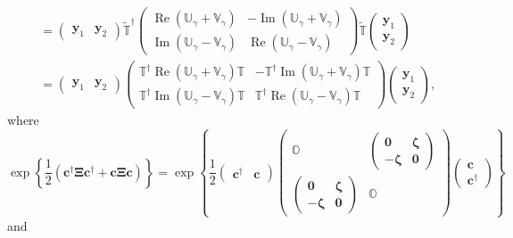 \documentclass[aps, preprint]{revtex4}
\begin{document}
\begin{align}
 &  =\left (\begin{array}{cc}\mathbf{y}_{1} & \mathbf{y}_{2}\end{array}\right ) \widetilde{\mathbb{T}}^{ \dag } \left (\begin{array}{cc}\ensuremath{\operatorname*{Re}} \left (\mathbb{U}_{\gamma } +\mathbb{V}_{\gamma }\right ) &  -\ensuremath{\operatorname*{Im}} \left (\mathbb{U}_{\gamma } +\mathbb{V}_{\gamma }\right ) \\
\ensuremath{\operatorname*{Im}} \left (\mathbb{U}_{\gamma } -\mathbb{V}_{\gamma }\right ) & \ensuremath{\operatorname*{Re}} \left (\mathbb{U}_{\gamma } -\mathbb{V}_{\gamma }\right )\end{array}\right ) \widetilde{\mathbb{T}} \left (\begin{array}{c}\mathbf{y}_{1} \\
\mathbf{y}_{2}\end{array}\right ) \\
 &  =\left (\begin{array}{cc}\mathbf{y}_{1} & \mathbf{y}_{2}\end{array}\right ) \left (\begin{array}{cc}\mathbb{T}^{ \dag } \ensuremath{\operatorname*{Re}} \left (\mathbb{U}_{\gamma } +\mathbb{V}_{\gamma }\right ) \mathbb{T} &  -\mathbb{T}^{ \dag } \ensuremath{\operatorname*{Im}} \left (\mathbb{U}_{\gamma } +\mathbb{V}_{\gamma }\right ) \mathbb{T} \\
\mathbb{T}^{ \dag } \ensuremath{\operatorname*{Im}} \left (\mathbb{U}_{\gamma } -\mathbb{V}_{\gamma }\right ) \mathbb{T} & \mathbb{T}^{ \dag } \ensuremath{\operatorname*{Re}} \left (\mathbb{U}_{\gamma } -\mathbb{V}_{\gamma }\right ) \mathbb{T}\end{array}\right ) \left (\begin{array}{c}\mathbf{y}_{1} \\
\mathbf{y}_{2}\end{array}\right )\text{,}\end{align}where
\begin{equation}\exp  \left \{\frac{1}{2} \left (\mathbf{c}^{ \dag } \mathbf{\Xi } \mathbf{c}^{ \dag } +\mathbf{c} \mathbf{\Xi } \mathbf{c}\right )\right \} =\exp  \left \{\frac{1}{2} \left (\begin{array}{cc}\mathbf{c}^{ \dag } & \mathbf{c}\end{array}\right ) \left (\begin{array}{cc}\mathbb{O} & \left (\begin{array}{cc}\mathbf{0} & \mathbf{\zeta } \\
 -\mathbf{\zeta } & \mathbf{0}\end{array}\right ) \\
\left (\begin{array}{cc}\mathbf{0} & \mathbf{\zeta } \\
 -\mathbf{\zeta } & \mathbf{0}\end{array}\right ) & \mathbb{O}\end{array}\right ) \left (\begin{array}{c}\mathbf{c} \\
\mathbf{c}^{ \dag }\end{array}\right )\right \}
\end{equation}and
\end{document}
